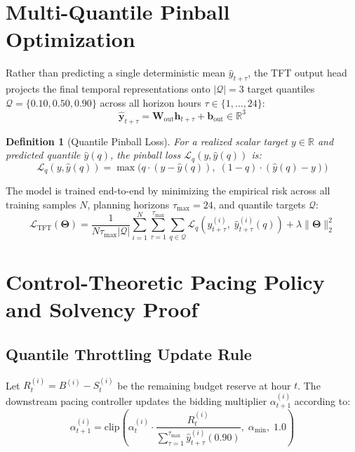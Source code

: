 \documentclass[11pt,a4paper]{article}
\newtheorem{definition}[theorem]{Definition}
\begin{document}
\section{Multi-Quantile Pinball Optimization}

Rather than predicting a single deterministic mean $\hat{y}_{t+\tau}$, the TFT output head projects the final temporal representations onto $|\mathcal{Q}| = 3$ target quantiles $\mathcal{Q} = \{0.10, 0.50, 0.90\}$ across all horizon hours $\tau \in \{1, \dots, 24\}$:
\begin{equation}
    \hat{\mathbf{y}}_{t+\tau} = \mathbf{W}_{\text{out}} \mathbf{h}_{t+\tau} + \mathbf{b}_{\text{out}} \in \mathbb{R}^3
\end{equation}

\begin{definition}[Quantile Pinball Loss]
For a realized scalar target $y \in \mathbb{R}$ and predicted quantile $\hat{y}(q)$, the pinball loss $\mathcal{L}_q(y, \hat{y}(q))$ is:
\begin{equation}
    \mathcal{L}_q(y, \hat{y}(q)) = \max\Big(q \cdot (y - \hat{y}(q)), \; (1 - q) \cdot (\hat{y}(q) - y)\Big)
\end{equation}
\end{definition}

The model is trained end-to-end by minimizing the empirical risk across all training samples $N$, planning horizons $\tau_{\max}=24$, and quantile targets $\mathcal{Q}$:
\begin{equation}
    \mathcal{L}_{\text{TFT}}(\boldsymbol{\Theta}) = \frac{1}{N \tau_{\max} |\mathcal{Q}|} \sum_{i=1}^N \sum_{\tau=1}^{\tau_{\max}} \sum_{q \in \mathcal{Q}} \mathcal{L}_q\left(y_{t+\tau}^{(i)}, \; \hat{y}_{t+\tau}^{(i)}(q)\right) + \lambda \|\boldsymbol{\Theta}\|_2^2
\end{equation}

\section{Control-Theoretic Pacing Policy and Solvency Proof}

\subsection{Quantile Throttling Update Rule}
Let $R_t^{(i)} = B^{(i)} - S_t^{(i)}$ be the remaining budget reserve at hour $t$. The downstream pacing controller updates the bidding multiplier $\alpha_{t+1}^{(i)}$ according to:
\begin{equation}
    \alpha_{t+1}^{(i)} = \text{clip}\left(\alpha_t^{(i)} \cdot \frac{R_t^{(i)}}{\sum_{\tau=1}^{\tau_{\max}} \hat{y}_{t+\tau}^{(i)}(0.90)}, \; \alpha_{\min}, \; 1.0\right)
    \label{eq:pacing_rule}
\end{equation}
\end{document}
